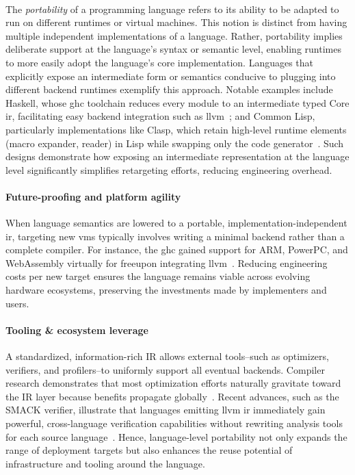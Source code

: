 	\paragraph{}%
  		The \emph{portability} of a programming language refers to its ability to be adapted to run on different runtimes or virtual machines. This notion is distinct from having multiple independent implementations of a language. Rather, portability implies deliberate support at the language's syntax or semantic level, enabling runtimes to more easily adopt the language's core implementation. Languages that explicitly expose an intermediate form or semantics conducive to plugging into different backend runtimes exemplify this approach. Notable examples include Haskell, whose \gls{ghc} toolchain reduces every module to an intermediate typed Core \gls{ir}, facilitating easy backend integration such as \gls{llvm}~\cite{ghc_llvm_backend}; and Common Lisp, particularly implementations like Clasp, which retain high-level runtime elements (macro expander, reader) in Lisp while swapping only the code generator~\cite{clasp_llvm}. Such designs demonstrate how exposing an intermediate representation at the language level significantly simplifies retargeting efforts, reducing engineering overhead.


	\paragraph{Future-proofing and platform agility}%
		When language semantics are lowered to a portable, implementation-independent \gls{ir}, targeting new \glspl{vm} typically involves writing a minimal backend rather than a complete compiler. For instance, the \gls{ghc} gained support for ARM, PowerPC, and WebAssembly virtually \smartQL for free\smartQR upon integrating \gls{llvm}~\cite{ghc_llvm_backend}. Reducing engineering costs per new target ensures the language remains viable across evolving hardware ecosystems, preserving the investments made by implementers and users.

	\paragraph{Tooling \& ecosystem leverage}%
		A standardized, information-rich IR allows external tools--such as optimizers, verifiers, and profilers--to uniformly support all eventual backends. Compiler research demonstrates that most optimization efforts naturally gravitate toward the IR layer because benefits propagate globally~\cite{ir_cacm}. Recent advances, such as the SMACK verifier, illustrate that languages emitting \gls{llvm} \gls{ir} immediately gain powerful, cross-language verification capabilities without rewriting analysis tools for each source language~\cite{llvm_verification}. Hence, language-level portability not only expands the range of deployment targets but also enhances the reuse potential of infrastructure and tooling around the language.

